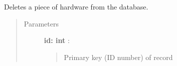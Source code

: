 \documentclass[letterpaper,10pt,english]{sphinxmanual}
\begin{document}
\begin{fulllineitems}
\label{index:roachnest_helpers.dbdelete}
Deletes a piece of hardware from the database.
\begin{quote}\begin{description}
\item[{Parameters }] \leavevmode
\textbf{id: int} :
\begin{quote}

Primary key (ID number) of record
\end{quote}

\end{description}\end{quote}

\end{fulllineitems}


\end{document}
